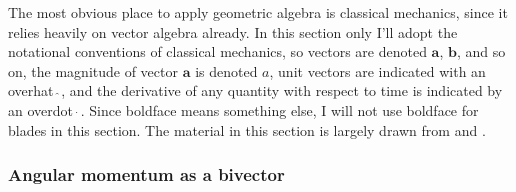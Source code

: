 \documentclass{utarticle}
\begin{document}
The most obvious place to apply geometric algebra is classical mechanics, since 
it relies heavily on vector algebra already.  In this section only I'll adopt the notational 
conventions of classical mechanics, so vectors are denoted $\bm{a}$, $\bm{b}$, 
and so on, the magnitude of vector $\bm{a}$ is denoted $a$, unit vectors are 
indicated with an overhat $\hat{\  }$, and the derivative of any quantity with respect 
to time is indicated by an overdot $\dot{\ }$.   Since boldface means something else, I
will not use boldface for blades in this section.  The material in this section is largely drawn
from \cite{NewFounds} and \cite{GAforphys}.

\subsubsection{Angular momentum as a bivector}
\label{Lbivec}
\end{document}
